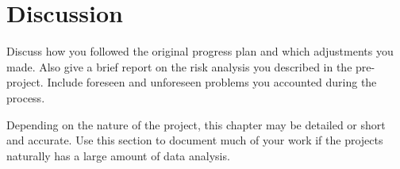 \section{Discussion}
Discuss how you followed the original progress plan and which adjustments you made. Also give a brief report on the risk analysis you described in the pre-project. Include foreseen and unforeseen problems you accounted during the process.

Depending on the nature of the project, this chapter may be detailed or short and accurate. Use this section to document much of your work if the projects naturally has a large amount of data analysis.

\pagebreak